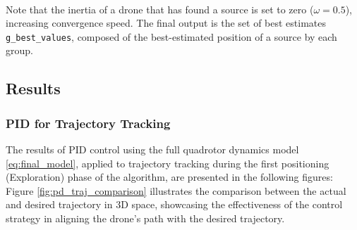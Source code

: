 \documentclass[main]{subfiles}
\begin{document}
\noindent\\
Note that the inertia of a drone that has found a source 
is set to zero (\(\omega = 0.5\)), increasing
convergence speed. The final output is the set of best estimates 
\texttt{g\_best\_values}, composed of the best-estimated position 
of a source by each group.

\newpage
\subsection{Results}
\subsubsection{PID for Trajectory Tracking}
The results of PID control using the full quadrotor dynamics 
model \eqref{eq:final_model},
applied to trajectory tracking during the first positioning 
(Exploration) phase of the algorithm, 
are presented in the following figures: 
Figure \ref{fig:pd_traj_comparison} illustrates 
the comparison between the actual and desired trajectory in 3D space, 
showcasing the effectiveness of the control strategy in 
aligning the drone's path with the desired trajectory.
\end{document}
